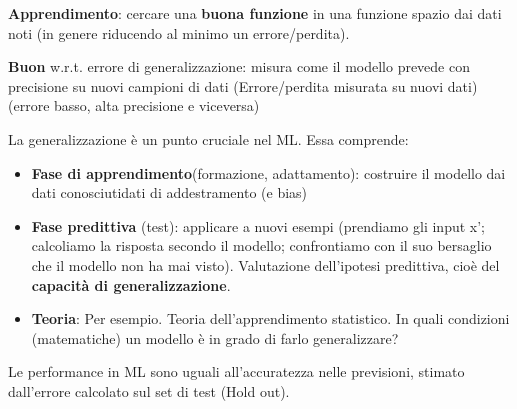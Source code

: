 \hspace{-15pt}\textbf{Apprendimento}: cercare una \textbf{buona funzione} in una funzione
spazio dai dati noti (in genere riducendo al minimo un errore/perdita).
\begin{definition}
    \textbf{Buon} w.r.t. errore di generalizzazione: misura come
    il modello prevede con precisione su nuovi campioni di dati
    (Errore/perdita misurata su nuovi dati) (errore basso, alta precisione e viceversa)
\end{definition}
\hspace{-15pt}La generalizzazione è un punto cruciale nel ML. Essa comprende:
\begin{itemize}
    \item \textbf{Fase di apprendimento}(formazione, adattamento): costruire il modello
    dai dati conosciutidati di addestramento (e bias)
    \item \textbf{Fase predittiva} (test): applicare a nuovi esempi (prendiamo gli input x’; calcoliamo la risposta secondo il modello; confrontiamo con il suo bersaglio che il modello non ha mai visto).
    Valutazione dell’ipotesi predittiva, cioè del \textbf{capacità di generalizzazione}.
    \item \textbf{Teoria}: Per esempio. Teoria dell'apprendimento statistico. In quali condizioni (matematiche) un modello è in grado di farlo generalizzare?
\end{itemize}
\begin{note}
    Le performance in ML sono uguali all'accuratezza nelle previsioni, stimato dall'errore calcolato sul set di test (Hold out).
\end{note}